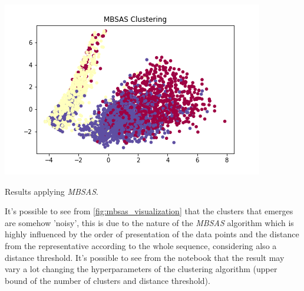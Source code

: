 \documentclass[12pt]{article}
\begin{document}
\begin{table}[ht]
\centering
\begin{minipage}[b]{0.4\linewidth}
\includegraphics[width=\linewidth]{images/figure_MBSAS.png}
\caption{Results applying \textit{MBSAS}.}
\label{fig:mbsas_visualization}
\end{minipage}
\begin{minipage}[b]{0.4\linewidth}
\caption{MBSAS clusters composition}
\label{tab:clusters_mbsas}
\end{minipage}
\end{table}

It's possible to see from \ref{fig:mbsas_visualization} that the clusters that emerges are somehow 'noisy', this is due to the nature of the \textit{MBSAS} algorithm which is highly influenced by the order of presentation of the data points and the distance from the representative according to the whole sequence, considering also a distance threshold. It's possible to see from the notebook that the result may vary a lot changing the hyperparameters of the clustering algorithm (upper bound of the number of clusters and distance threshold). 
\end{document}
